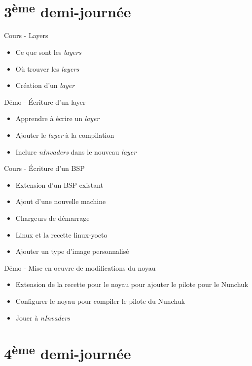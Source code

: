 \documentclass[a4paper,12pt,obeyspaces,spaces,hyphens]{article}
\begin{document}
\section{3\textsuperscript{ème} demi-journée}

\feagendatwocolumn
{Cours - Layers}
{
  \begin{itemize}
  \item Ce que sont les {\em layers}
  \item Où trouver les {\em layers}
  \item Création d'un {\em layer}
  \end{itemize}
}
{Démo - Écriture d'un layer}
{
  \begin{itemize}
  \item Apprendre à écrire un {\em layer}
  \item Ajouter le {\em layer} à la compilation
  \item Inclure {\em nInvaders} dans le nouveau {\em layer}
  \end{itemize}
}

\feagendatwocolumn
{Cours - Écriture d'un BSP}
{
  \begin{itemize}
  \item Extension d'un BSP existant
  \item Ajout d'une nouvelle machine
  \item Chargeurs de démarrage
  \item Linux et la recette linux-yocto
  \item Ajouter un type d'image personnalisé
  \end{itemize}
}
{Démo - Mise en oeuvre de modifications du noyau}
{
  \begin{itemize}
  \item Extension de la recette pour le noyau pour ajouter le pilote
        pour le Nunchuk
  \item Configurer le noyau pour compiler le pilote du Nunchuk
  \item Jouer à {\em nInvaders}
  \end{itemize}
}

\section{4\textsuperscript{ème} demi-journée}
\end{document}
